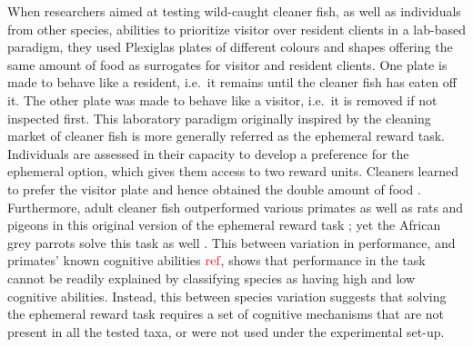 \documentclass[]{rsos}%
\begin{document}
When researchers aimed at testing wild-caught cleaner fish, as
well as individuals from other species, abilities
to prioritize visitor over resident clients in a lab-based paradigm,
they used Plexiglas plates of different colours and shapes offering the same
amount of food as surrogates for visitor and resident clients.
One plate is made to behave like a resident, i.e.~it remains until
the cleaner fish has eaten off it. The other plate was made to behave
like a visitor, i.e.~it is removed if not inspected first.
This laboratory paradigm originally inspired by the cleaning market
of cleaner fish is more generally referred as the ephemeral reward task.
Individuals are assessed in their capacity to develop a preference for the
ephemeral option, which gives them access to two reward units.
Cleaners learned to prefer the visitor plate and
hence obtained the double amount of food \citep{bshary_Asymmetric_2002}.
Furthermore, adult cleaner fish outperformed various primates as well as rats and
pigeons in this original version of the ephemeral reward task
\citep{salwiczek_Adult_2012, zentall_Early_2017}; yet the African grey
parrots solve this task as well \citep{pepperberg_Can_2014}.
This between variation in performance, and primates' known cognitive abilities
\(\color{red}{\text{ref}}\), shows that performance in the task
cannot be readily explained by classifying species as having high and
low cognitive abilities. Instead, this between species variation suggests
that solving the ephemeral reward task requires a set of cognitive
mechanisms that are not present in all the tested taxa, or were not used
under the experimental set-up.
\end{document}
